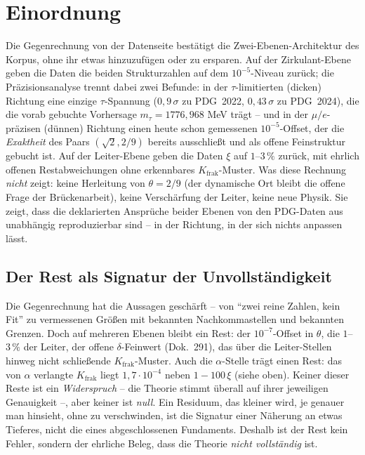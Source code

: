 \section{Einordnung}
Die Gegenrechnung von der Datenseite bestätigt die Zwei-Ebenen-Architektur
des Korpus, ohne ihr etwas hinzuzufügen oder zu ersparen. Auf der
Zirkulant-Ebene geben die Daten die beiden Strukturzahlen auf dem
$10^{-5}$-Niveau zurück; die Präzisionsanalyse trennt dabei zwei Befunde:
in der $\tau$-limitierten (dicken) Richtung eine einzige
$\tau$-Spannung ($0{,}9\,\sigma$ zu PDG~2022, $0{,}43\,\sigma$ zu PDG~2024),
die die vorab gebuchte Vorhersage
$m_\tau = 1776{,}968$ MeV trägt -- und in der $\mu/e$-präzisen (dünnen)
Richtung einen heute schon gemessenen $10^{-5}$-Offset, der die
\emph{Exaktheit} des Paars $(\sqrt2, 2/9)$ bereits ausschließt und als
offene Feinstruktur gebucht ist. Auf der Leiter-Ebene
geben die Daten $\xi$ auf $1$--$3\,\%$ zurück, mit ehrlich offenen
Restabweichungen ohne erkennbares $K_{\text{frak}}$-Muster. Was diese
Rechnung \emph{nicht} zeigt: keine Herleitung von $\theta=2/9$ (der
dynamische Ort bleibt die offene Frage der Brückenarbeit), keine
Verschärfung der Leiter, keine neue Physik. Sie zeigt, dass die deklarierten
Ansprüche beider Ebenen von den PDG-Daten aus unabhängig reproduzierbar sind
-- in der Richtung, in der sich nichts anpassen lässt.

\subsection{Der Rest als Signatur der Unvollständigkeit}
Die Gegenrechnung hat die Aussagen geschärft -- von \enquote{zwei reine
Zahlen, kein Fit} zu vermessenen Größen mit bekannten Nachkommastellen und
bekannten Grenzen. Doch auf mehreren Ebenen bleibt ein Rest: der
$10^{-7}$-Offset in $\theta$, die $1$--$3\,\%$ der Leiter, der offene
$\delta$-Feinwert (Dok.~291), das über die Leiter-Stellen hinweg nicht
schließende $K_{\text{frak}}$-Muster. Auch die $\alpha$-Stelle trägt einen Rest: das von $\alpha$ verlangte
$K_{\text{frak}}$ liegt $1{,}7\cdot10^{-4}$ neben $1-100\,\xi$ (siehe oben). Keiner dieser Reste ist ein
\emph{Widerspruch} -- die Theorie stimmt überall auf ihrer jeweiligen
Genauigkeit --, aber keiner ist \emph{null}. Ein Residuum, das kleiner
wird, je genauer man hinsieht, ohne zu verschwinden, ist die Signatur einer
Näherung an etwas Tieferes, nicht die eines abgeschlossenen Fundaments.
Deshalb ist der Rest kein Fehler, sondern der ehrliche Beleg, dass die
Theorie \emph{nicht vollständig} ist.

